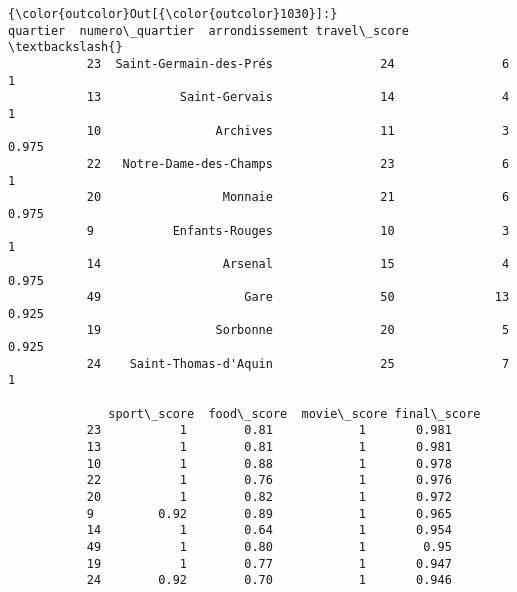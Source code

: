 \documentclass[11pt]{article}
\begin{document}
\begin{Verbatim}[commandchars=\\\{\}]
{\color{outcolor}Out[{\color{outcolor}1030}]:}                   quartier  numero\_quartier  arrondissement travel\_score  \textbackslash{}
           23  Saint-Germain-des-Prés               24               6            1   
           13           Saint-Gervais               14               4            1   
           10                Archives               11               3        0.975   
           22   Notre-Dame-des-Champs               23               6            1   
           20                 Monnaie               21               6        0.975   
           9           Enfants-Rouges               10               3            1   
           14                 Arsenal               15               4        0.975   
           49                    Gare               50              13        0.925   
           19                Sorbonne               20               5        0.925   
           24    Saint-Thomas-d'Aquin               25               7            1   
           
              sport\_score  food\_score  movie\_score final\_score  
           23           1        0.81            1       0.981  
           13           1        0.81            1       0.981  
           10           1        0.88            1       0.978  
           22           1        0.76            1       0.976  
           20           1        0.82            1       0.972  
           9         0.92        0.89            1       0.965  
           14           1        0.64            1       0.954  
           49           1        0.80            1        0.95  
           19           1        0.77            1       0.947  
           24        0.92        0.70            1       0.946  
\end{Verbatim}
            
\end{document}
